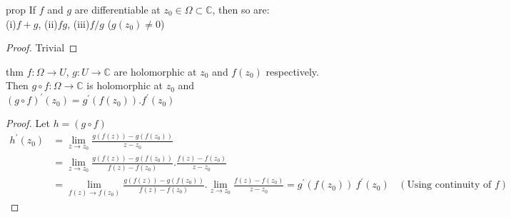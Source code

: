 \begin{restatable}[]{prop}{}\label{}
If $f$ and $g$ are differentiable at $z_0\in \Omega \subset \mathds{C}$, then so are:\\
(i)$f+g$, (ii)$fg$, (iii)$f/g$ ($g(z_0)\neq 0$)
\end{restatable}
\begin{proof}
Trivial
\end{proof}
\begin{restatable}{thm}{}\label{}
$f:\Omega \rightarrow U$, $g:U\rightarrow \mathds{C}$ are holomorphic at $z_0$ and $f(z_0)$ respectively.\\
Then $g\circ f:\Omega\rightarrow \mathds{C}$ is holomorphic at $z_0$ and $(g\circ f)^{'}(z_0)=g^{'}(f(z_0)).f^{'}(z_0)$
\end{restatable}
\begin{proof}
Let $h=(g\circ f)$ 
\begin{equation*}
\begin{split}
h^{'}(z_0)&= \lim_{z \to z_0} \frac{g(f(z))-g(f(z_0))}{z-z_0} \\
&=\lim_{z \to z_0} \frac{g(f(z))-g(f(z_0))}{f(z)-f(z_0)}.\frac{f(z)-f(z_0)}{z-z_0} \\
&=\lim_{f(z) \to f(z_0)} \frac{g(f(z))-g(f(z_0))}{f(z)-f(z_0)}.\lim_{z \to z_0} \frac{f(z)-f(z_0)}{z-z_0}=g^{'}(f(z_0))\:f^{'}(z_0) \:\:\:\: (\text{Using continuity of $f$}) 
\end{split}
\end{equation*}
\end{proof}
